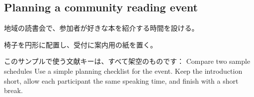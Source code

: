 \subsection{Planning a community reading event}


地域の読書会で、参加者が好きな本を紹介する時間を設ける。


椅子を円形に配置し、受付に案内用の紙を置く。


このサンプルで使う文献キーは、すべて架空のものです：
\citep{Example2024-aa,Demo2023-bb}
Compare two sample schedules\citep{Sample2022-cc}
Use a simple planning checklist\citep{Placeholder2021-dd} for the event.
Keep the introduction short, allow each participant the same speaking time, and finish with a short break.
